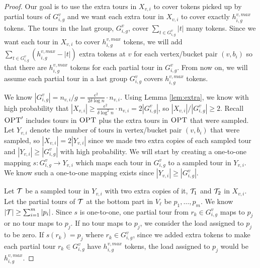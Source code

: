 \documentclass[twoside,leqno]{article}
\newcommand{\calT}{{\cal T}}
\newcommand{\OPT}{\mbox{\sc OPT}}
\newcommand{\eps}{\epsilon}
\begin{document}
\begin{proof}
Our goal is to use the extra tours in $X_{v,i}$ to cover tokens picked up by partial tours of $G^v_{i,g}$ and we want each extra tour in $X_{v,i}$ to cover exactly $h^{v,max}_{i,g}$ tokens. The tours in the last group, $G^v_{i,g}$, cover $\sum_{t \in G^v_{i,g}} |t|$ many tokens. Since we want each tour in $X_{v,i}$ to cover $h^{v,max}_{i,g}$ tokens, we will add $\sum_{t \in G^v_{i,g}} (h^{v,max}_{i,g} - |t|)$ extra tokens at $v$ for each vertex/bucket pair $(v,b_i)$ so that there are $h^{v,max}_{i,g}$ tokens for each partial tour in $G^v_{i,g}$.  From now on, we will assume each partial tour in a last group $G^v_{i,g}$ covers $h^{v,max}_{i,g}$ tokens.

We know $|G^v_{i,g}| = n_{v,i}/g = \frac{\eps^2 }{2\delta \log n} \cdot n_{v,i}$. Using Lemma \ref{lem:extra}, we know with high probability that $|X_{v,i}| \ge \frac{\eps^2 }{\delta\log^2 n} \cdot n_{v,i} =2 |G^v_{i,g}|$, so $|X_{v,i}|/|G^v_{i,g}| \ge 2$. Recall $\OPT'$ includes tours in $\OPT$ plus the extra tours in $\OPT$ that were sampled.  Let $Y_{v,i}$ denote the number of tours in vertex/bucket pair $(v,b_i)$ that were sampled, so $|X_{v,i}| = 2|Y_{v,i}|$ since we made two extra copies of each sampled tour and $|Y_{v,i}|\ge |G^v_{i,g}|$ with high probability. We will start by creating a one-to-one mapping $s : G^v_{i,g} \rightarrow Y_{v,i}$ which maps each tour in $G^v_{i,g}$ to a sampled tour in $Y_{v,i}$. We know such a one-to-one mapping exists since $|Y_{v,i}|\ge |G^v_{i,g}|$.

Let $\calT$ be a sampled tour in $Y_{v,i}$ with two extra copies of it, $\calT_1$ and $\calT_2$ in $X_{v,i}$. Let the partial tours of $\calT$ at the bottom part in $V_\ell$ be $p_1, \ldots, p_m$. We know $|\calT| \ge \sum_{i = 1}^m |p_i|$. Since $s$ is one-to-one, one partial tour from $r_k \in G^v_{i,g}$ maps to $p_j$ or no tour maps to $p_j$. If no tour maps to $p_j$, we consider the load assigned to $p_j$ to be zero. If $s(r_k) = p_j$ where  $r_k \in G^v_{i,g}$, since we added extra tokens to make each partial tour $r_k \in G^v_{i,g}$ have $h^{v,max}_{i,g}$ tokens, the load assigned to $p_j$ would be $h^{v,max}_{i,g}$.


\end{proof}
\end{document}
